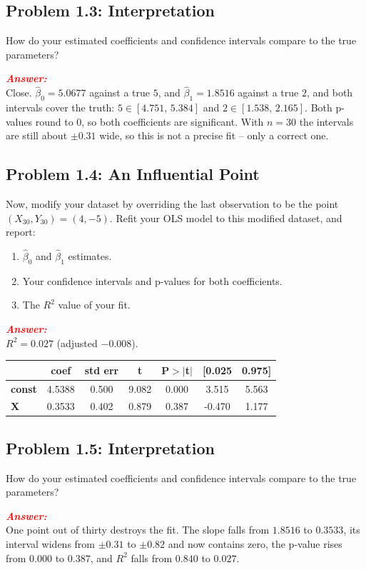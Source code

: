 \documentclass[11pt, letterpaper]{article}
\newcommand{\subproblem}[1]{\subsection*{Problem #1}}
\newcommand{\answer}{\textbf{\textit{\textcolor{red}{Answer:}}}\\}
\begin{document}
\subproblem{1.3: Interpretation}

How do your estimated coefficients and confidence intervals compare to the true parameters?

\answer
Close. $\hat{\beta}_0 = 5.0677$ against a true $5$, and $\hat{\beta}_1 = 1.8516$ against a true $2$,
and both intervals cover the truth: $5 \in [4.751,\, 5.384]$ and $2 \in [1.538,\, 2.165]$. Both
p-values round to $0$, so both coefficients are significant. With $n = 30$ the intervals are still
about $\pm 0.31$ wide, so this is not a precise fit -- only a correct one.


\subproblem{1.4: An Influential Point}

Now, modify your dataset by overriding the last observation to be the point $(X_{30}, Y_{30}) = (4, -5)$.
Refit your OLS model to this modified dataset, and report:
\begin{enumerate}
    \item $\hat{\beta}_0$ and $\hat{\beta}_1$ estimates.
    \item Your confidence intervals and p-values for both coefficients.
    \item The $R^2$ value of your fit.
\end{enumerate}

\answer
$R^2 = 0.027$ (adjusted $-0.008$).

\begin{center}
\begin{tabular}{lcccccc}
\toprule
               & \textbf{coef} & \textbf{std err} & \textbf{t} & \textbf{P$> |$t$|$} & \textbf{[0.025} & \textbf{0.975]}  \\
\midrule
\textbf{const} &       4.5388  &        0.500     &     9.082  &         0.000        &        3.515    &        5.563     \\
\textbf{X}     &       0.3533  &        0.402     &     0.879  &         0.387        &       -0.470    &        1.177     \\
\bottomrule
\end{tabular}
\end{center}

\subproblem{1.5: Interpretation}

How do your estimated coefficients and confidence intervals compare to the true parameters?

\answer
One point out of thirty destroys the fit. The slope falls from $1.8516$ to $0.3533$, its interval
widens from $\pm 0.31$ to $\pm 0.82$ and now contains zero, the p-value rises from $0.000$ to
$0.387$, and $R^2$ falls from $0.840$ to $0.027$.
\end{document}

